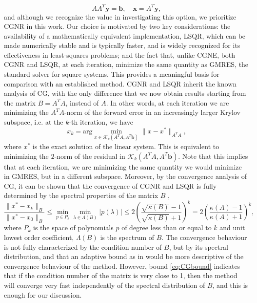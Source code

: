 \documentclass[hidelinks,onefignum,onetabnum]{siamart220329}
\newcommand{\bb}[1]{#1}
\let\vec\mathbf
\begin{document}
\begin{equation}
    AA^T\vec{y} = \vec{b}, \quad \vec{x} = A^T\vec{y},
\end{equation}
and although we recognize the value in investigating this option, we prioritize CGNR in this work. Our choice is motivated by two key considerations: the availability of \bb{a} mathematically equivalent  implementation, LSQR, which can be made numerically stable and is typically faster, and is widely recognized for its effectiveness in least-squares problems; and the fact that, unlike CGNE, both CGNR and LSQR, at each iteration, minimize the same quantity as GMRES, the standard solver for square systems.  This provides a meaningful basis for comparison with \bb{an} established method.
CGNR and LSQR inherit the known analysis of CG, with the only difference that we now obtain results starting from the matrix $B = A^TA$, instead of $A$. In other words, at each iteration we are minimizing the $A^TA$-norm of the forward error in an increasingly larger Krylov subspace, i.e. at the $k$-th iteration, we have
\begin{equation}
    x_k = \text{arg}\min_{x\in \mathcal{K}_k(A^TA,A^T\vec{b})} \|x - x^*\|_{A^TA},
\end{equation}
where $x^*$ is the exact solution of the linear system. This is equivalent to minimizing the $2$-norm of the residual in $\mathcal{K}_k(A^TA,A^T\vec{b})$. Note that this implies that at each iteration, we are minimizing the same quantity we would minimize in GMRES, but in a different subspace. Moreover, by the convergence analysis of CG, it can be shown that the convergence of CGNR and LSQR is fully determined by the spectral properties of the matrix ${B}$ \cite{Trefethen},
\begin{equation}
    \label{eq:CGbound}
    \frac{\|x^*-x_k\|_B}{\|x^*-x_0\|_B} \leq \underset{p\in P_k}{\bb{\min}} \underset{\lambda \in \Lambda(B)}{\bb{\min}} |p(\lambda)| \leq 2 \left(\frac{\sqrt{\kappa(B)}-1}{\sqrt{\kappa(B)}+1} \right)^k = 2 \left(\frac{\kappa(A)-1}{\kappa(A)+1} \right)^k,
\end{equation}
where $P_k$ is the space of polynomials $p$ of degree less than or equal to $k$ and unit lowest order coefficient, $\Lambda(B)$ is the spectrum of $B$.
The convergence behaviour is not fully characterized by the condition number of $B$, but by its spectral distribution, and that an adaptive bound as in \cite{Strakos2} would be more descriptive of the convergence behaviour of the method. However, bound \eqref{eq:CGbound} indicates that if the condition number of the matrix is very close to 1, then the method will converge very fast independently of the spectral distribution of $B$, and this is enough for our discussion.
\end{document}
